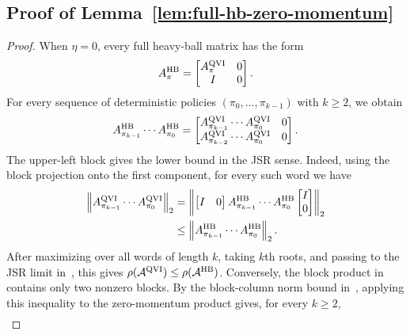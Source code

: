 \documentclass[letterpaper]{article}
\numberwithin{equation}{section}
\begin{document}
\subsection{Proof of Lemma~\ref{lem:full-hb-zero-momentum}}
\label{app:proof-lem-full-hb-zero-momentum}

\begin{proof}
When $\eta=0$, every full heavy-ball matrix has the form
\begin{align*}
  A_\pi^{\rm HB}
  =
  \begin{bmatrix}
    A_\pi^{\rm QVI}&0\\
    I&0
  \end{bmatrix}.
\end{align*}
For every sequence of deterministic policies $(\pi_0,\ldots,\pi_{k-1})$ with $k\ge2$, we obtain
\begin{align}
  A_{\pi_{k-1}}^{\rm HB}\cdots A_{\pi_0}^{\rm HB}
  =
  \begin{bmatrix}
    A_{\pi_{k-1}}^{\rm QVI}\cdots A_{\pi_0}^{\rm QVI}&0\\
    A_{\pi_{k-2}}^{\rm QVI}\cdots A_{\pi_0}^{\rm QVI}&0
  \end{bmatrix}.
  \label{eq:zero-momentum-full-product}
\end{align}
The upper-left block gives the lower bound in the JSR sense. Indeed, using the
block projection onto the first component, for every such word we have
\begin{align*}
  \left\lVert
    A_{\pi_{k-1}}^{\rm QVI}\cdots A_{\pi_0}^{\rm QVI}
  \right\rVert_2
  &=
  \left\lVert
  \begin{bmatrix}I&0\end{bmatrix}
  A_{\pi_{k-1}}^{\rm HB}\cdots A_{\pi_0}^{\rm HB}
  \begin{bmatrix}I\\0\end{bmatrix}
  \right\rVert_2 \\
  &\le
  \left\lVert
    A_{\pi_{k-1}}^{\rm HB}\cdots A_{\pi_0}^{\rm HB}
  \right\rVert_2.
\end{align*}
After maximizing over all words of length $k$, taking $k$th roots, and passing
to the JSR limit in~, this gives
$\rho(\mathcal A^{\rm QVI})\le\rho(\mathcal A^{\rm HB})$. Conversely, the block product in~ contains only two nonzero blocks. By the block-column norm bound in~, applying this inequality to the zero-momentum product gives, for every $k\ge2$,
\begin{align*}

\end{align*}
\end{proof}
\end{document}
